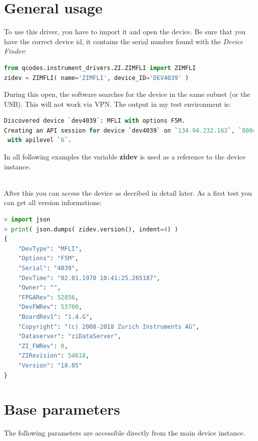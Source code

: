 \documentclass[11pt]{article} %
\begin{document}
\section{General usage}

To use this driver, you have to import it and open the device. Be sure that you have the correct device id, it contains the serial number found with the {\it Device Finder}:

\begin{lstlisting}[frame=single, language=Python]
from qcodes.instrument_drivers.ZI.ZIMFLI import ZIMFLI
zidev = ZIMFLI( name='ZIMFLI', device_ID='DEV4039' )
\end{lstlisting}

During this open, the software searches for the device in the same subnet (or the USB). This will not work via VPN. The output in my test environment is:
\begin{lstlisting}[frame=single, language=Python]
Discovered device `dev4039`: MFLI with options F5M.
Creating an API session for device `dev4039` on `134.94.232.162`, `8004`
 with apilevel `6`.
\end{lstlisting}

In all following examples the variable {\bf zidev} is used as a reference to the device instance.

\ \\

After this you can access the device as decribed in detail later. As a first test you can get all version informations:
\begin{lstlisting}[frame=single, language=Python]
> import json
> print( json.dumps( zidev.version(), indent=4) )
{
    "DevType": "MFLI",
    "Options": "F5M",
    "Serial": "4039",
    "DevTime": "02.01.1970 10:41:25.265187",
    "Owner": "",
    "FPGARev": 52856,
    "DevFWRev": 53700,
    "BoardRev1": "1.4.G",
    "Copyright": "(c) 2008-2018 Zurich Instruments AG",
    "Dataserver": "ziDataServer",
    "ZI_FWRev": 0,
    "ZIRevision": 54618,
    "Version": "18.05"
}
\end{lstlisting}


\clearpage

\section{Base parameters}

The following parameters are accessible directly from the main device instance.
\end{document}
